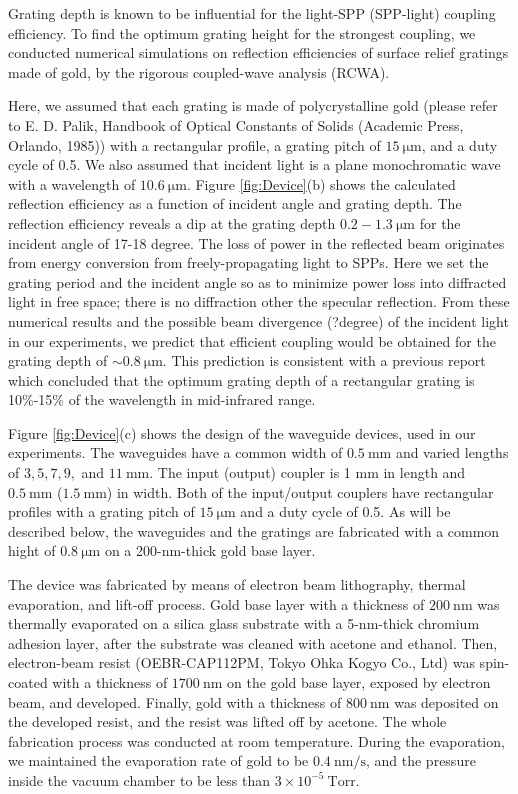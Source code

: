 \documentclass[twocolumn,10.5pt,a4]{article}
\begin{document}
Grating depth is known to be influential for the light-SPP (SPP-light) coupling efficiency\cite{Koev}\cite{Justin}. 
To find the optimum grating height for the strongest coupling, we conducted numerical simulations on reflection efficiencies of surface relief gratings made of gold, by the rigorous coupled-wave analysis (RCWA)\cite{Leveque}. 

Here, we assumed that each grating is made of polycrystalline gold (please refer to E. D. Palik, Handbook of Optical Constants of Solids (Academic Press, Orlando, 1985)) with a rectangular profile, a grating pitch of $15\:\mathrm{\mu m}$, and a duty cycle of 0.5. We also assumed that incident light is a plane monochromatic wave with a wavelength of $10.6\:\mathrm{\mu m}$. 
Figure \ref{fig:Device}(b) shows the calculated reflection efficiency as a function of incident angle and grating depth. The reflection efficiency reveals a dip at the grating depth $0.2-1.3\:\mathrm{\mu m}$ for the incident angle of 17-18 degree. 
The loss of power in the reflected beam originates from energy conversion from freely-propagating light to SPPs.
Here we set the grating period and the incident angle so as to minimize power loss into diffracted light in free space; there is no diffraction other the specular reflection.  From these numerical results and the possible beam divergence (?degree) of the incident light in our experiments, we predict that efficient coupling would be obtained for the grating depth of $\sim0.8\:\mathrm{\mu m}$. This prediction is consistent with a previous report which concluded that the optimum grating depth of a rectangular grating is 10\%-15\% of the wavelength in mid-infrared range\cite{Justin}.

Figure \ref{fig:Device}(c) shows the design of the waveguide devices, used in our experiments.  The waveguides have a common width of $0.5\:\mathrm{mm}$ and varied lengths of $3, 5, 7, 9,$ and $11\:\mathrm{mm}$. The input (output) coupler is 1 mm in length and $0.5\:\mathrm{mm}$ ($1.5\:\mathrm{mm}$) in width. Both of the input/output couplers have rectangular profiles with a grating pitch of $15\:\mathrm{\mu m}$ and a duty cycle of 0.5. As will be described below, the waveguides and the gratings are fabricated with a common hight of $0.8\:\mathrm{\mu m}$ on a 200-nm-thick gold base layer.

The device was fabricated by means of electron beam lithography, thermal evaporation, and lift-off process. Gold base layer with a thickness of $200\:\mathrm{nm}$ was thermally evaporated on a silica glass substrate with a 5-nm-thick chromium adhesion layer, after the substrate was cleaned with acetone and ethanol. Then, electron-beam resist (OEBR-CAP112PM, Tokyo Ohka Kogyo Co., Ltd) was spin-coated with a thickness of $1700\:\mathrm{nm}$ on the gold base layer, exposed by electron beam, and developed. Finally, gold with a thickness of $800\:\mathrm{nm}$ was deposited on the developed resist, and the resist was lifted off by acetone. The whole fabrication process was conducted at room temperature. During the evaporation, we maintained the evaporation rate of gold to be $0.4\:\mathrm{nm/s}$, and the pressure inside the vacuum chamber to be less than $3\times10^{-5}\:\mathrm{Torr}$. 
\end{document}
